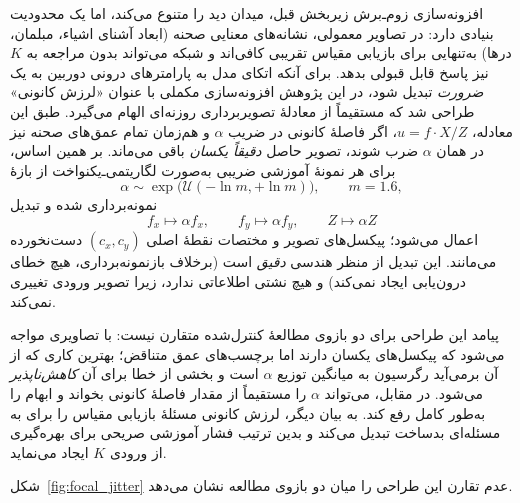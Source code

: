 افزونه‌سازی زوم‌ـ‌برش زیربخش قبل، میدان دید را متنوع می‌کند، اما یک محدودیت بنیادی دارد: در تصاویر معمولی، نشانه‌های معنایی صحنه (ابعاد آشنای اشیاء، مبلمان، درها) به‌تنهایی برای بازیابی مقیاس تقریبی کافی‌اند و شبکه می‌تواند بدون مراجعه به $K$ نیز پاسخ قابل قبولی بدهد. برای آنکه اتکای مدل به پارامترهای درونی دوربین به یک \emph{ضرورت} تبدیل شود، در این پژوهش افزونه‌سازی مکملی با عنوان «لرزش کانونی» طراحی شد که مستقیماً از معادلهٔ تصویربرداری روزنه‌ای الهام می‌گیرد. طبق این معادله، $u = f \cdot X / Z$، اگر فاصلهٔ کانونی در ضریب $\alpha$ و هم‌زمان تمام عمق‌های صحنه نیز در همان $\alpha$ ضرب شوند، تصویر حاصل \emph{دقیقاً یکسان} باقی می‌ماند. بر همین اساس، برای هر نمونهٔ آموزشی ضریبی به‌صورت لگاریتمی‌ـ‌یکنواخت از بازهٔ
\begin{equation}
\alpha \sim \exp\bigl(\mathcal{U}(-\ln m, +\ln m)\bigr), \qquad m = 1.6,
\end{equation}
نمونه‌برداری شده و تبدیل
\begin{equation}
f_x \mapsto \alpha f_x, \qquad f_y \mapsto \alpha f_y, \qquad Z \mapsto \alpha Z
\end{equation}
اعمال می‌شود؛ پیکسل‌های تصویر و مختصات نقطهٔ اصلی $(c_x, c_y)$ دست‌نخورده می‌مانند. این تبدیل از منظر هندسی \emph{دقیق} است (برخلاف بازنمونه‌برداری، هیچ خطای درون‌یابی ایجاد نمی‌کند) و هیچ نشتی اطلاعاتی ندارد، زیرا تصویر ورودی تغییری نمی‌کند.

پیامد این طراحی برای دو بازوی مطالعهٔ کنترل‌شده متقارن نیست: \controlmodel{} با تصاویری مواجه می‌شود که پیکسل‌های یکسان دارند اما برچسب‌های عمق متناقض؛ بهترین کاری که از آن برمی‌آید رگرسیون به میانگین توزیع $\alpha$ است و بخشی از خطا برای آن \emph{کاهش‌ناپذیر} می‌شود. در مقابل، \proposedmodel{} می‌تواند $\alpha$ را مستقیماً از مقدار فاصلهٔ کانونی بخواند و ابهام را به‌طور کامل رفع کند. به بیان دیگر، لرزش کانونی مسئلهٔ بازیابی مقیاس را برای \controlmodel{} به مسئله‌ای بدساخت تبدیل می‌کند و بدین ترتیب فشار آموزشی صریحی برای بهره‌گیری از ورودی $K$ ایجاد می‌نماید.

شکل~\ref{fig:focal_jitter} عدم تقارن این طراحی را میان دو بازوی مطالعه نشان می‌دهد.

